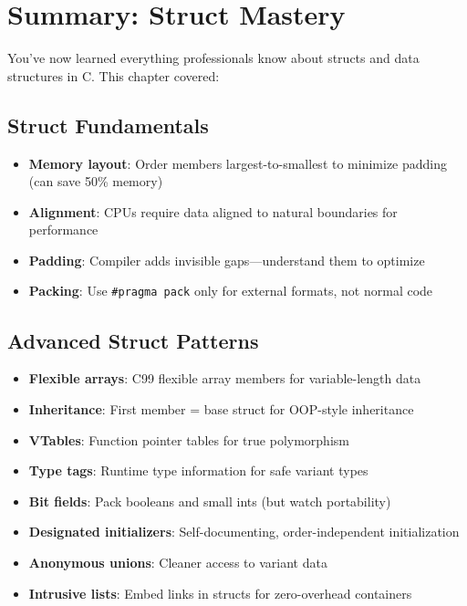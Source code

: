 \section{Summary: Struct Mastery}

You've now learned everything professionals know about structs and data structures in C. This chapter covered:

\subsection{Struct Fundamentals}

\begin{itemize}
    \item \textbf{Memory layout}: Order members largest-to-smallest to minimize padding (can save 50\% memory)
    \item \textbf{Alignment}: CPUs require data aligned to natural boundaries for performance
    \item \textbf{Padding}: Compiler adds invisible gaps—understand them to optimize
    \item \textbf{Packing}: Use \texttt{\#pragma pack} only for external formats, not normal code
\end{itemize}

\subsection{Advanced Struct Patterns}

\begin{itemize}
    \item \textbf{Flexible arrays}: C99 flexible array members for variable-length data
    \item \textbf{Inheritance}: First member = base struct for OOP-style inheritance
    \item \textbf{VTables}: Function pointer tables for true polymorphism
    \item \textbf{Type tags}: Runtime type information for safe variant types
    \item \textbf{Bit fields}: Pack booleans and small ints (but watch portability)
    \item \textbf{Designated initializers}: Self-documenting, order-independent initialization
    \item \textbf{Anonymous unions}: Cleaner access to variant data
    \item \textbf{Intrusive lists}: Embed links in structs for zero-overhead containers
\end{itemize}

